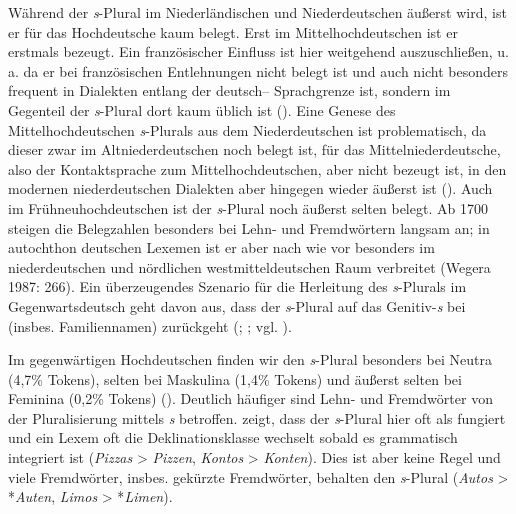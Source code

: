  
Während der  \textit{s}-Plural im Niederländischen und Niederdeutschen äußerst  wird, ist er für das Hochdeutsche kaum belegt. Erst im Mittelhochdeutschen ist er erstmals bezeugt. Ein französischer Einfluss ist hier weitgehend auszuschließen, u.\,a. da er bei französischen Entlehnungen nicht belegt ist und auch nicht besonders frequent in Dialekten entlang der deutsch– Sprachgrenze ist, sondern im Gegenteil der \textit{s}-Plural dort kaum üblich ist (\cite[122–126]{Oehmann1924}). Eine Genese des Mittelhochdeutschen \textit{s}-Plurals aus dem Niederdeutschen ist problematisch, da dieser zwar im Altniederdeutschen noch belegt ist, für das Mittelniederdeutsche, also der Kontaktsprache zum Mittelhochdeutschen, aber nicht bezeugt ist, in den modernen niederdeutschen Dialekten aber hingegen wieder äußerst  ist (\cite[147–150]{Lindowetal1998}). Auch im Frühneuhochdeutschen ist der \textit{s}-Plural noch äußerst selten belegt. Ab 1700 steigen die Belegzahlen besonders bei Lehn- und Fremdwörtern langsam an; in autochthon deutschen Lexemen ist er aber nach wie vor besonders im niederdeutschen und nördlichen westmitteldeutschen Raum verbreitet (Wegera 1987: 266). Ein überzeugendes Szenario für die Herleitung des \textit{s}-Plurals im Gegenwartsdeutsch geht davon aus, dass der \textit{s}-Plural auf das Genitiv-\textit{s} bei  (insbes. Familiennamen) zurückgeht (\cite[93]{Wegener2004}; \cite{NueblingSchmuck2010}; vgl. \cite[436f]{Schirmunski1962}).
   
Im gegenwärtigen Hochdeutschen finden wir den \textit{s}-Plural besonders bei Neutra (4,7\% Tokens), selten bei Maskulina (1,4\% Tokens) und äußerst selten bei Feminina (0,2\% Tokens) (\cite[45–48]{Pavlov1995}). Deutlich häufiger sind Lehn- und Fremdwörter von der Pluralisierung mittels \textit{s} betroffen. \cite{Wegener2004} zeigt, dass der \textit{s}-Plural hier oft als  fungiert und ein Lexem oft die Deklinationsklasse wechselt sobald es grammatisch integriert ist  (\textit{Pizzas} > \textit{Pizzen}, \textit{Kontos} > \textit{Konten}). Dies ist aber keine Regel und viele Fremdwörter, insbes. gekürzte Fremdwörter, behalten den \textit{s}-Plural (\textit{Autos} > *\textit{Auten}, \textit{Limos} > *\textit{Limen}).
   
